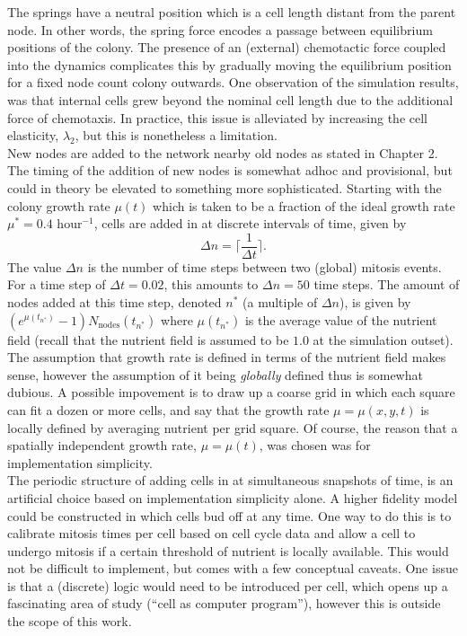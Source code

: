 The springs have a neutral position which is a cell length distant from the parent node.
In other words, the spring force encodes a passage between equilibrium positions of the colony.
The presence of an (external) chemotactic force coupled into the dynamics complicates 
this by gradually moving the equilibrium position for a fixed node count colony outwards.
One observation of the simulation results, was that internal cells grew beyond the nominal cell length
due to the additional force of chemotaxis. In practice,
this issue is alleviated by increasing the cell elasticity, $\lambda_2$, but this 
is nonetheless a limitation.
\\

New nodes are added to the network nearby old nodes as stated in Chapter 2. The timing
of the addition of new nodes is somewhat adhoc and provisional, but could in theory
be elevated to something more sophisticated. Starting with the colony growth rate 
$\mu(t)$ which is taken to be a fraction of the ideal growth rate $\mu^* = 0.4$ hour$^{-1}$,
cells are added in at discrete intervals of time, given by 
\begin{equation*}
    \Delta n = \bigg\lceil \frac{1}{\Delta t} \bigg\rceil.
\end{equation*}
The value $\Delta n$ is the number of time steps between two (global) mitosis events. For a
time step of $\Delta t = 0.02$, this amounts to $\Delta n = 50$ time steps. The amount of 
nodes added at this time step, denoted $n^*$ (a multiple of $\Delta n$), is given by 
$(e^{\mu(t_{n^*})} -1) N_{\textrm{nodes}}(t_{n^*})$ where $\mu (t_{n^*})$ 
is the average value of the nutrient field (recall that the nutrient field is assumed to 
be $1.0$ at the simulation outset). The assumption that growth rate is defined
in terms of the nutrient field makes sense, however the assumption of it being \textit{globally} 
defined thus is somewhat dubious. A possible impovement is to draw up a coarse 
grid in which each square can fit a dozen or more cells, and say that 
the growth rate $\mu = \mu(x,y,t)$ is locally defined by averaging nutrient per grid square. 
Of course, the reason 
that a spatially independent growth rate, $\mu = \mu(t)$, was chosen was for 
implementation simplicity.
\\

The periodic structure of adding cells in at simultaneous snapshots of time,
is an artificial choice based on implementation simplicity alone. 
A higher fidelity model could be constructed in which cells bud off at any time.
One way to do this is to calibrate mitosis times per cell based on cell cycle data
and allow a cell to undergo mitosis if a certain threshold of nutrient is locally
available. This would not be difficult to implement, but 
comes with a few conceptual caveats. One issue is that 
a (discrete) logic would need to be introduced per cell,
which opens up a fascinating area of study (``cell as computer program''), however 
this is outside the scope of this work.
\\

